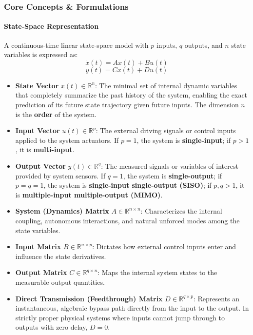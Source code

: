 \documentclass[12pt,onecolumn,twoside ]{article}
\begin{document}
	\subsubsection{Core Concepts \& Formulations}
	\paragraph{State-Space Representation}
	A continuous-time linear state-space model with $p$ inputs, $q$ outputs, and $n$ state variables is expressed as: \[
	\dot{x}(t) = Ax(t) + Bu(t)
	\] \[
	y(t) = Cx(t) + Du(t)
	\]
	\begin{itemize}
		\item
		\textbf{State Vector} $x(t) \in \mathbb{R}^n$: The minimal set of internal dynamic variables that completely summarize the past history of the system, enabling the exact prediction of its future state trajectory given future inputs. The dimension $n$ is the \textbf{order} of the system.
		\item
		\textbf{Input Vector} $u(t) \in \mathbb{R}^p$: The external driving signals or control inputs applied to the system actuators. If $p = 1$, the system is \textbf{single-input}; if $p > 1$, it is \textbf{multi-input}.
		\item
		\textbf{Output Vector} $y(t) \in \mathbb{R}^q$: The measured signals or variables of interest provided by system sensors. If $q = 1$, the system is \textbf{single-output}; if $p = q = 1$, the system is \textbf{single-input single-output (SISO)}; if $p, q > 1$, it is \textbf{multiple-input multiple-output (MIMO)}.
		\item
		\textbf{System (Dynamics) Matrix} $A \in \mathbb{R}^{n \times n}$: Characterizes the internal coupling, autonomous interactions, and natural unforced modes among the state variables.
		\item
		\textbf{Input Matrix} $B \in \mathbb{R}^{n \times p}$: Dictates how external control inputs enter and influence the state derivatives.
		\item
		\textbf{Output Matrix} $C \in \mathbb{R}^{q \times n}$: Maps the internal system states to the measurable output quantities.
		\item
		\textbf{Direct Transmission (Feedthrough) Matrix} $D \in \mathbb{R}^{q \times p}$: Represents an instantaneous, algebraic bypass path directly from the input to the output. In strictly proper physical systems where inputs cannot jump through to outputs with zero delay, $D = 0$.
	\end{itemize}
	
\end{document}

